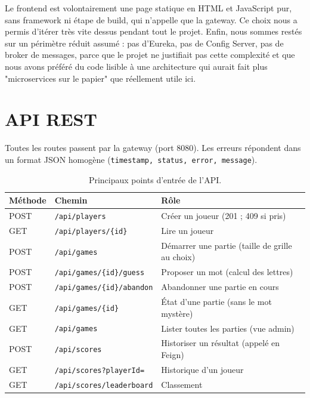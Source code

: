 \documentclass[11pt,a4paper]{article}
\begin{document}
Le frontend est volontairement une page statique en HTML et JavaScript pur, sans
framework ni étape de build, qui n'appelle que la gateway. Ce choix nous a permis
d'itérer très vite dessus pendant tout le projet. Enfin, nous sommes restés sur un
périmètre réduit assumé : pas d'Eureka, pas de Config Server, pas de broker de
messages, parce que le projet ne justifiait pas cette complexité et que nous avons
préféré du code lisible à une architecture qui aurait fait plus "microservices sur le
papier" que réellement utile ici.

\section{API REST}
Toutes les routes passent par la gateway (port 8080). Les erreurs répondent dans un
format JSON homogène (\texttt{timestamp, status, error, message}).

\begin{table}[h]
\centering
\small
\begin{tabular}{@{}lll@{}}
\toprule
\textbf{Méthode} & \textbf{Chemin} & \textbf{Rôle} \\
\midrule
POST & \texttt{/api/players}            & Créer un joueur (201 ; 409 si pris) \\
GET  & \texttt{/api/players/\{id\}}     & Lire un joueur \\
POST & \texttt{/api/games}              & Démarrer une partie (taille de grille au choix) \\
POST & \texttt{/api/games/\{id\}/guess} & Proposer un mot (calcul des lettres) \\
POST & \texttt{/api/games/\{id\}/abandon} & Abandonner une partie en cours \\
GET  & \texttt{/api/games/\{id\}}       & État d'une partie (sans le mot mystère) \\
GET  & \texttt{/api/games}              & Lister toutes les parties (vue admin) \\
POST & \texttt{/api/scores}             & Historiser un résultat (appelé en Feign) \\
GET  & \texttt{/api/scores?playerId=}   & Historique d'un joueur \\
GET  & \texttt{/api/scores/leaderboard} & Classement \\
\bottomrule
\end{tabular}
\caption{Principaux points d'entrée de l'API.}
\end{table}
\end{document}
